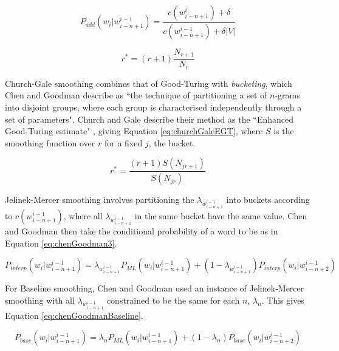 \begin{equation}
\label{eq:additiveSmoothing}
P_{add}(w_{i}|w_{i-n+1}^{i-1})=\frac{c(w_{i-n+1}^{i})+\delta}{c(w_{i-n+1}^{i-1})+\delta|V|}
\end{equation}

\begin{equation}
\label{eq:goodTuringSmoothing}
r^{*}=(r+1)\frac{N_{r+1}}{N_{r}}
\end{equation}

Church-Gale smoothing combines that of Good-Turing with \textit{bucketing}, which Chen and Goodman describe as ``the technique of partitioning a set of $n$-grams into disjoint groups, where each group is characterised independently through a set of parameters". Church and Gale describe their method as the ``Enhanced Good-Turing estimate" \cite{church1991comparison}, giving Equation \ref{eq:churchGaleEGT}, where $S$ is the smoothing function over $r$ for a fixed $j$, the bucket.

\begin{equation}
r^{*}=\frac{(r+1)S(N_{jr+1})}{S(N_{jr})}
\label{eq:churchGaleEGT}
\end{equation}

%
Jelinek-Mercer smoothing involves partitioning the $\lambda_{w_{i-n+1}^{i-1}}$ into buckets according to $c(w_{i-n+1}^{i-1})$, where all $\lambda_{w_{i-n+1}^{i-1}}$ in the same bucket have the same value. Chen and Goodman then take the conditional probability of a word to be as in Equation \ref{eq:chenGoodman3}.

\begin{equation}
P_{interp}(w_{i}|w_{i-n+1}^{i-1})=\lambda_{w_{i-n+1}^{i-1}}P_{ML}(w_{i}|w_{i-n+1}^{i-1})+(1-\lambda_{w_{i-n+1}^{i-1}})P_{interp}(w_{i}|w_{i-n+2}^{i-1})
\label{eq:chenGoodman3}
\end{equation}

For Baseline smoothing, Chen and Goodman used an instance of Jelinek-Mercer smoothing with all $\lambda_{w_{i-n+1}^{i-1}}$ constrained to be the same for each $n$, $\lambda_{n}$. This gives Equation \ref{eq:chenGoodmanBaseline}.

\begin{equation}
P_{base}(w_{i}|w_{i-n+1}^{i-1})=\lambda_{n}P_{ML}(w_{i}|w_{i-n+1}^{i-1})+(1-\lambda_{n})P_{base}(w_{i}|w_{i-n+2}^{i-1})
\label{eq:chenGoodmanBaseline}
\end{equation}

